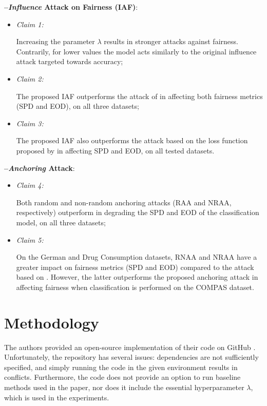 \textbf{--\hspace{2mm}\textit{Influence} Attack on Fairness (IAF)}:
    \begin{itemize}
    \itemsep0.0em 
        \item \hypertarget{claim-1}{\textit{Claim 1:}} Increasing the parameter $\lambda$ results in stronger attacks against fairness. Contrarily, for lower values the model acts similarly to the original influence attack \citep{koh2018} targeted towards accuracy;
        \item \hypertarget{claim-2}{\textit{Claim 2:}} The proposed IAF outperforms the attack of \citet{koh2018} in affecting both fairness metrics (SPD and EOD), on all three datasets;
        \item \hypertarget{claim-3}{\textit{Claim 3:}} The proposed IAF also outperforms the attack based on the loss function proposed by \citet{solans2020} in affecting SPD and EOD, on all tested datasets.
    \end{itemize}
\textbf{--\hspace{2mm}\textit{Anchoring} Attack}:
    \begin{itemize}
    \itemsep0.0em 
        \item \hypertarget{claim-4}{\textit{Claim 4:}} Both random and non-random anchoring attacks (RAA and NRAA, respectively) outperform \citet{koh2018} in degrading the SPD and EOD of the classification model, on all three datasets;
        \item \hypertarget{claim-5}{\textit{Claim 5:}} On the German and Drug Consumption datasets, RNAA and NRAA have a greater impact on fairness metrics (SPD and EOD) compared to the attack based on \citet{solans2020}. However, the latter outperforms the proposed anchoring attack in affecting fairness when classification is performed on the COMPAS dataset.
    \end{itemize}
\section{Methodology}
\label{sec:methodology}

The authors provided an open-source implementation of their code on GitHub \citep{original_github}. Unfortunately, the repository has several issues: dependencies are not sufficiently specified, and simply running the code in the given environment results in conflicts. Furthermore, the code does not provide an option to run baseline methods used in the paper, nor does it include the essential hyperparameter $\lambda$, which is used in the experiments. 

